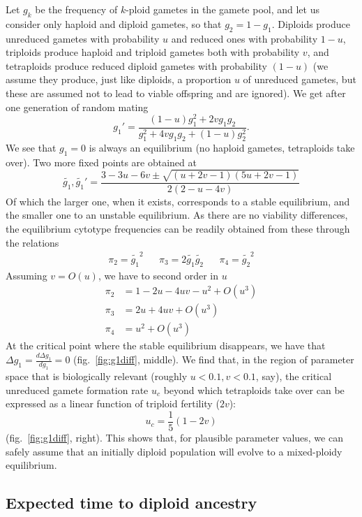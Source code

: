 Let \(g_k\) be the frequency of \(k\)-ploid gametes in the gamete pool,
and let us consider only haploid and diploid gametes, so that
\(g_2 = 1-g_1\). Diploids produce unreduced gametes with probability
\(u\) and reduced ones with probability \(1-u\), triploids produce
haploid and triploid gametes both with probability \(v\), and
tetraploids produce reduced diploid gametes with probability \((1-u)\)
(we assume they produce, just like diploids, a proportion \(u\) of
unreduced gametes, but these are assumed not to lead to viable offspring
and are ignored). We get after one generation of random mating
\[g_1' = \frac{(1-u)g_1^2 + 2vg_1g_2}{g_1^2 + 4vg_1g_2 + (1-u)g_2^2}.\]
We see that \(g_1=0\) is always an equilibrium (no haploid gametes,
tetraploids take over). Two more fixed points are obtained at
\begin{equation}
  \tilde{g_1}, \tilde{g_1}' =
    \frac{3 - 3u - 6v \pm \sqrt{(u + 2v - 1)(5u + 2v - 1)}}
         {2(2 - u - 4v)} \label{eq:gameteq}
  \end{equation} Of which the larger one, when it exists, corresponds to
a stable equilibrium, and the smaller one to an unstable equilibrium. As
there are no viability differences, the equilibrium cytotype frequencies
can be readily obtained from these through the relations \begin{align}
\pi_2 = \tilde{g_1}^2 & & \pi_3 = 2\tilde{g_1}\tilde{g_2} & & 
    \pi_4 = \tilde{g_2}^2
\label{eq:cyteq}
\end{align} Assuming \(v=O(u)\), we have to second order in \(u\)
\begin{align}
 \pi_2 &= 1 - 2u - 4uv - u^2 + O(u^3)  \nonumber \\
 \pi_3 &= 2u + 4uv + O(u^3) \nonumber \\
 \pi_4 &= u^2 + O(u^3) 
\end{align} At the critical point where the stable equilibrium
disappears, we have that \(\Delta g_1 = \frac{d\Delta g_1}{d g_1} = 0\)
(fig.~\ref{fig:g1diff}, middle). We find that, in the region of
parameter space that is biologically relevant (roughly
\(u < 0.1, v < 0.1\), say), the critical unreduced gamete formation rate
\(u_c\) beyond which tetraploids take over can be expressed as a linear
function of triploid fertility (\(2v\)): \[u_c = \frac{1}{5}(1-2v)\]
(fig.~\ref{fig:g1diff}, right). This shows that, for plausible parameter
values, we can safely assume that an initially diploid population will
evolve to a mixed-ploidy equilibrium.

\hypertarget{sec:ttdip}{%
\subsection{Expected time to diploid ancestry}\label{sec:ttdip}}

